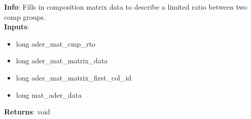 \textbf{Info}: Fills in composition matrix data to describe a limited ratio
between two comp groups. \\

\noindent \textbf{Inputs}:
\begin{itemize}
\item{long ader\_mat\_cmp\_rto}
\item{long ader\_mat\_matrix\_data}
\item{long ader\_mat\_matrix\_first\_col\_id}
\item{long mat\_ader\_data}
\end{itemize}

\noindent \textbf{Returns}: void
